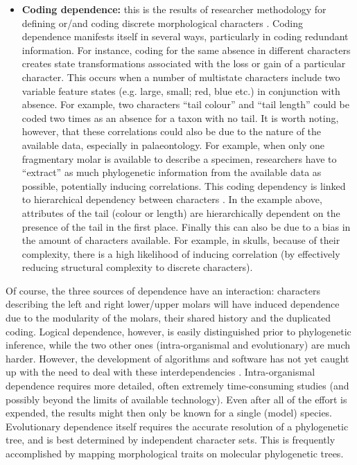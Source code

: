 \documentclass[12pt,letterpaper]{article}
\begin{document}
\begin{itemize}
    \item \textbf{Coding dependence:} this is the results of researcher methodology for defining or/and coding discrete morphological characters \citep{Brazeau2011,simoes2017giant}.
    Coding dependence manifests itself in several ways, particularly in coding redundant information.
    For instance, coding for the same absence in different characters creates state transformations associated with the loss or gain of a particular character.
    This occurs when a number of multistate characters include two variable feature states (e.g. large, small; red, blue etc.) in conjunction with absence.
    For example, two characters ``tail colour'' and ``tail length'' could be coded two times as an absence for a taxon with no tail.
    It is worth noting, however, that these correlations could also be due to the nature of the available data, especially in palaeontology.
    For example, when only one fragmentary molar is available to describe a specimen, researchers have to ``extract'' as much phylogenetic information from the available data as possible, potentially inducing correlations.
    This coding dependency is linked to hierarchical dependency between characters \citep{wilkinson1995coping,BrazeauNA}.
    In the example above, attributes of the tail (colour or length) are hierarchically dependent on the presence of the tail in the first place.
    Finally this can also be due to a bias in the amount of characters available.
    For example, in skulls, because of their complexity, there is a high likelihood of inducing correlation (by effectively reducing structural complexity to discrete characters).
\end{itemize}

\noindent Of course, the three sources of dependence have an interaction: characters describing the left and right lower/upper molars will have induced dependence due to the modularity of the molars, their shared history and the duplicated coding.
Logical dependence, however, is easily distinguished prior to phylogenetic inference, while the two other ones (intra-organismal and evolutionary) are much harder.
However, the development of algorithms and software has not yet caught up with the need to deal with these interdependencies \citep{de2015parsimony,BrazeauNA}.
Intra-organismal dependence requires more detailed, often extremely time-consuming studies (and possibly beyond the limits of available technology).
Even after all of the effort is expended, the results might then only be known for a single (model) species.
Evolutionary dependence itself requires the accurate resolution of a phylogenetic tree, and is best determined by independent character sets. 
This is frequently accomplished by mapping morphological traits on molecular phylogenetic trees.
\end{document}
